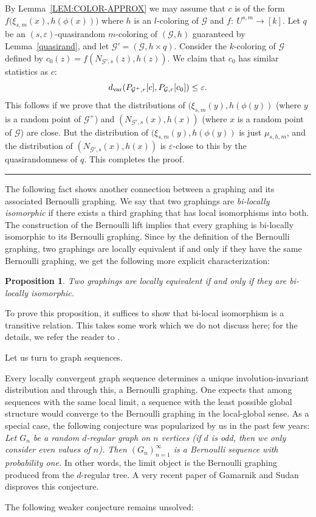 \documentclass{article}
\newtheorem{proposition}[theorem]{Proposition}
\def\proofend{\hfill\rule{2mm}{2mm}}
\def\GG{\mathcal{G}}\def\HH{\mathcal{H}}\def\II{\mathcal{I}}
\def\eps{\varepsilon}
\begin{document}
By Lemma~\ref{LEM:COLOR-APPROX} we may assume that $c$ is of the form
$f\bigl(\xi_{s,m}(x),h(\phi(x))\big)$ where $h$ is an $l$-coloring
of $\GG$ and $f:~U^{s,m}\to[k]$. Let $q$ be an $(s,\eps)$-quasirandom
$m$-coloring of $(\GG,h)$ guaranteed by Lemma~\ref{quasirand}, and
let $\GG'=(\GG,h \times q)$. Consider the $k$-coloring of $\GG$
defined by $c_0(z)=f(N_{\GG',s}(z),h(z))$. We claim that $c_0$ has
similar statistics as $c$:
\[
d_{\rm var}(P_{\GG^+,r}[c],P_{\GG,r}[c_0])\le\eps.
\]
This follows if we prove that the distributions of
$(\xi_{s,m}(y),h(\phi(y))$ (where $y$ is a random point of $\GG^+$)
and $(N_{\GG',s}(x),h(x))$ (where $x$ is a random point of $\GG$) are
close. But the distribution of $(\xi_{s,m}(y),h(\phi(y))$ is just
$\mu_{s,h,m}$, and the distribution of $(N_{\GG',s}(x),h(x))$ is
$\eps$-close to this by the quasirandomness of $q$. This completes
the proof.\proofend

\medskip

The following fact shows another connection between a graphing and
its associated Bernoulli graphing. We say that two graphings are
\emph{bi-locally isomorphic} if there exists a third graphing that
has local isomorphisms into both. The construction of the Bernoulli
lift implies that every graphing is bi-locally isomorphic to its
Bernoulli graphing. Since by the definition of the Bernoulli
graphing, two graphings are locally equivalent if and only if they
have the same Bernoulli graphing, we get the following more explicit
characterization:

\begin{proposition}\label{PROP:LOC-BILOC}
Two graphings are locally equivalent if and only if they are
bi-locally isomorphic.
\end{proposition}

To prove this proposition, it suffices to show that bi-local
isomorphism is a transitive relation. This takes some work which we
do not discuss here; for the details, we refer {the} reader to
\cite{LL}.

\medskip

Let us turn to graph sequences. {Every locally convergent graph
sequence determines a unique involution-invariant distribution and
through this, a Bernoulli graphing. One expects that among sequences
with the same local limit, a sequence with the least possible global
structure would converge to the Bernoulli graphing in the
local-global sense. As a special case, the following conjecture was
popularized by us in the past few years: {\it Let $G_n$ be a random
$d$-regular graph on $n$ vertices (if $d$ is odd, then we only
consider even values of $n$). Then $(G_n)_{n=1}^\infty$ is a
Bernoulli sequence with probability one.} In other words, the limit
object is the Bernoulli graphing produced from the $d$-regular tree.
A very recent paper of Gamarnik and Sudan \cite{GaSu} disproves this
conjecture.

The following weaker conjecture remains unsolved:}
\end{document}
